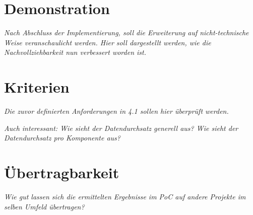 
\section{Demonstration}

	\textit{Nach Abschluss der Implementierung, soll die Erweiterung auf nicht-technische Weise veranschaulicht werden. Hier soll dargestellt werden, wie die Nachvollziehbarkeit nun verbessert worden ist.}
	
\section{Kriterien}

	\textit{Die zuvor definierten Anforderungen in 4.1 sollen hier überprüft werden.}

	\textit{Auch interessant: Wie sieht der Datendurchsatz generell aus? Wie sieht der Datendurchsatz pro Komponente aus?}
	
\section{Übertragbarkeit}
\label{sec:uebertragbarkeit}

	\textit{Wie gut lassen sich die ermittelten Ergebnisse im PoC auf andere Projekte im selben Umfeld übertragen?}